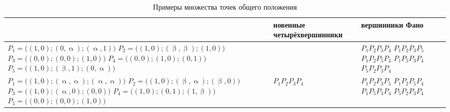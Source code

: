 \begin{table}[H]
    \begin{changemargin}{-2.4cm}{0cm}
\caption{Примеры множества точек общего положения}
\end{changemargin}
\label{tab:my-table}
\begin{center}
\begin{tabular}{m{4.5cm}m{2.7cm}m{2.7cm}}
  \toprule
\parbox[c][][c]{0.3\textwidth}{ } & \parbox[c][][c]{0.2\textwidth}{ \-но\-вен\-ные четырёх\-вершинники} & \parbox[c][][c]{0.2\textwidth}{ \-вершинники Фано} \\
\midrule
$P_1 = \bigl((1,0);(0,\upalpha);(\upalpha,1)\bigr)$\newline
                $P_2 = \bigl((1,0);(\upbeta,\upbeta);(1,0)\bigr)$\newline
                $P_3 = \bigl((0,0);(0,0);(1,0)\bigr)$\newline
                $P_4 = \bigl((0,0);(1,0);(0,1)\bigr)$\newline
                $P_5 = \bigl((1,0);(\upbeta,1);(0,\upalpha)\bigr)$
      &
      &            $P_1P_2P_3P_4$ \newline
                      $P_1P_2P_3P_5$\newline
                        $P_1P_2P_5P_4$\newline
                        $P_1P_5P_3P_4$\newline
                        $P_5P_2P_3P_4$             \\
\midrule

$P_1 = \bigl((1,0);(\upalpha,\upalpha);(\upalpha,\upalpha)\bigr)$\newline
$P_2 = \bigl((1,0);(\upbeta,\upalpha);(\upbeta,0)\bigr)$\newline
$P_3 = \bigl((1,0);(\upalpha,0);(0,0)\bigr)$\newline
$P_4 = \bigl((1,0);(0,1);(1,\upbeta)\bigr)$\newline
$P_5 = \bigl((0,0);(0,0);(1,0)\bigr)$     &
            $P_1P_2P_3P_4$                   &
                              $P_1P_2P_3P_5$\newline
                              $P_1P_2P_5P_4$\newline
                              $P_1P_5P_3P_4$\newline
                              $P_5P_2P_3P_4$                 \\


\end{tabular}
\end{center}
\end{table}
